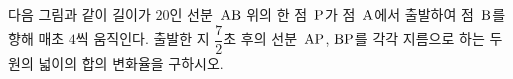 다음 그림과 같이 길이가 $20$인 선분~$\mathrm{AB}$ 위의 한 점~$\mathrm{P}$가 점~$\mathrm{A}$에서 출발하여 점~$\mathrm{B}$를 향해 매초 $4$씩 움직인다. 출발한 지 $\dfrac{7}{2}$초 후의 선분~$\mathrm{AP}$, $\mathrm{BP}$를 각각 지름으로 하는 두 원의 넓이의 합의 변화율을 구하시오.
\par\smallskip\begin{center}\resizebox{\ifdim\width>\linewidth\linewidth\else\width\fi}{!}{}\end{center}
